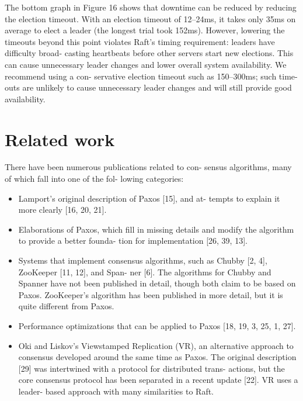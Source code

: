 \documentclass[journal]{IEEEtran}
\begin{document}
The bottom graph in Figure 16 shows that downtime can be reduced by reducing the election timeout. With an election timeout of 12–24ms, it takes only 35ms on average to elect a leader (the longest trial took 152ms). However, lowering the timeouts beyond this point violates Raft’s timing requirement: leaders have difficulty broad- casting heartbeats before other servers start new elections. This can cause unnecessary leader changes and lower overall system availability. We recommend using a con- servative election timeout such as 150–300ms; such time- outs are unlikely to cause unnecessary leader changes and will still provide good availability.

\section{Related work}

There have been numerous publications related to con- sensus algorithms, many of which fall into one of the fol- lowing categories:
\begin{itemize}
\item Lamport’s original description of Paxos [15], and at- tempts to explain it more clearly [16, 20, 21].\\
\item Elaborations of Paxos, which fill in missing details and modify the algorithm to provide a better founda- tion for implementation [26, 39, 13]. \\
\item Systems that implement consensus algorithms, such as Chubby [2, 4], ZooKeeper [11, 12], and Span- ner [6]. The algorithms for Chubby and Spanner have not been published in detail, though both claim to be based on Paxos. ZooKeeper’s algorithm has been published in more detail, but it is quite different from Paxos. \\
\item Performance optimizations that can be applied to Paxos [18, 19, 3, 25, 1, 27].
\item Oki and Liskov’s Viewstamped Replication (VR), an alternative approach to consensus developed around the same time as Paxos. The original description [29] was intertwined with a protocol for distributed trans- actions, but the core consensus protocol has been separated in a recent update [22]. VR uses a leader- based approach with many similarities to Raft.
\end{itemize}
\end{document}
